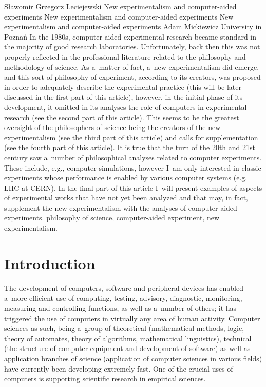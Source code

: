 \begin{artengenv}{Sławomir Grzegorz Leciejewski}
	{New experimentalism and computer-aided experiments}
	{New experimentalism and computer-aided experiments}
	{New experimentalism and computer-aided experiments}
	{Adam Mickiewicz University in Poznań}
	{In the 1980s, computer-aided experimental research became standard in the majority of good research laboratories. Unfortunately, back then this was not properly reflected in the professional literature related to the philosophy and methodology of science. As a~matter of fact, a~new experimentalism did emerge, and this sort of philosophy of experiment, according to its creators, was proposed in order to adequately describe the experimental practice (this will be later discussed in the first part of this article), however, in the initial phase of its development, it omitted in its analyses the role of computers in experimental research (see the second part of this article). This seems to be the greatest oversight of the philosophers of science being the creators of the new experimentalism (see the third part of this article) and calls for supplementation (see the fourth part of this article). It is true that the turn of the 20th and 21st century saw a~number of philosophical analyses related to computer experiments. These include, e.g., computer simulations, however I~am only interested in classic experiments whose performance is enabled by various computer systems (e.g. LHC at CERN). In the final part of this article I~will present examples of aspects of experimental works that have not yet been analyzed and that may, in fact, supplement the new experimentalism with the analyses of computer-aided experiments.
	}
	{philosophy of science, computer-aided experiment, new experimentalism.}





\section*{Introduction}

\lettrine[loversize=0.13,lines=2,lraise=-0.03,nindent=0em,findent=0.2pt]%
{T}{}he development of computers, software and peripheral devices has enabled a~more efficient use of computing, testing, advisory, diagnostic, monitoring, measuring and controlling functions, as well as a~number of others; it has triggered the use of computers in virtually any area of human activity. Computer sciences as such, being a~group of theoretical (mathematical methods, logic, theory of automates, theory of algorithms, mathematical linguistics), technical (the structure of computer equipment and development of software) as well as application branches of science (application of computer sciences in various fields) have currently been developing extremely fast. One of the crucial uses of computers is supporting scientific research in empirical sciences.


\end{artengenv}
